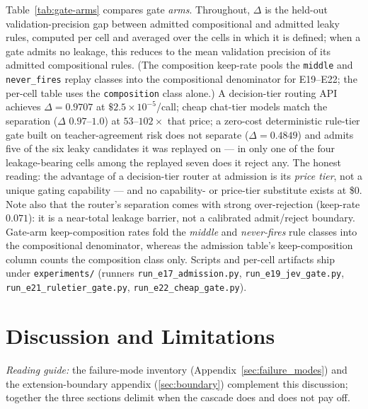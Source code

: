 \documentclass[11pt]{article}
\theoremstyle{plain}
\begin{document}
\begin{table}[t]
\centering
\caption{Gate arms on the same admission workload: capability ($\Delta$
separation), per-call price, reject-leakage, and composition keep-rate
(reject-leakage is the mean over leakage-bearing cells). The
decision-tier router separates near-oracle at three orders of magnitude below
teacher cost; cheap chat-tier models match its separation at $53$--$102\times$
its price; the zero-cost deterministic rule-tier gate does not separate.}
\label{tab:gate-arms}

\end{table}

Table~\ref{tab:gate-arms} compares gate \emph{arms}. Throughout, $\Delta$ is
the held-out validation-precision gap between admitted compositional and
admitted leaky rules, computed per cell and averaged over the cells in
which it is defined; when a gate admits no leakage, this reduces to the
mean validation precision of its admitted compositional rules. (The
composition keep-rate pools the \texttt{middle} and \texttt{never\_fires}
replay classes into the compositional denominator for E19--E22; the per-cell
table uses the \texttt{composition} class alone.) A decision-tier routing API
achieves $\Delta=0.9707$ at $\$2.5\times10^{-5}$/call; cheap chat-tier models
match the separation ($\Delta$ $0.97$--$1.0$) at $53$--$102\times$ that price;
a zero-cost deterministic rule-tier gate built on teacher-agreement risk does
not separate ($\Delta=0.4849$) and admits five of the six leaky candidates it was replayed on
--- in only one of the four leakage-bearing cells among the replayed seven
does it reject any. The
honest reading: the advantage of a decision-tier router at admission is its
\emph{price tier}, not a unique gating capability --- and no capability- or
price-tier substitute exists at \$0. Note also that the router's separation
comes with strong over-rejection (keep-rate $0.071$): it is a near-total
leakage barrier, not a calibrated admit/reject boundary. Gate-arm
keep-composition rates fold the \emph{middle} and \emph{never-fires} rule
classes into the compositional denominator, whereas the admission table's
keep-composition column counts the composition class only. Scripts and per-cell
artifacts ship under \texttt{experiments/} (runners \texttt{run\_e17\_admission.py},
\texttt{run\_e19\_jev\_gate.py}, \texttt{run\_e21\_ruletier\_gate.py},
\texttt{run\_e22\_cheap\_gate.py}).

\section{Discussion and Limitations}
\label{sec:limitations}
\noindent\emph{Reading guide:} the failure-mode inventory
(Appendix~\ref{sec:failure_modes}) and the extension-boundary appendix
(\ref{sec:boundary}) complement this discussion; together the three sections
delimit when the cascade does and does not pay off.
\end{document}
